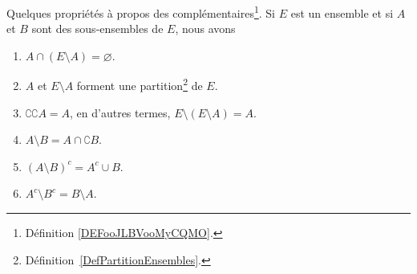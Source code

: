\begin{lemma}       \label{LemPropsComplement}
	Quelques propriétés à propos des complémentaires\footnote{Définition \ref{DEFooJLBVooMyCQMO}.}. Si \( E\) est un ensemble et si \( A\) et \( B\) sont des sous-ensembles de \( E\), nous avons
	\begin{enumerate}
		\item       \label{ITEMooComplementDisjoint}
		      \(A \cap ( E \setminus A) = \varnothing \).
		\item       \label{ITEMooComplementPartition}
		      \( A \) et \( E \setminus A \) forment une partition\footnote{Définition~\ref{DefPartitionEnsembles}.} de \( E \).
		\item       \label{ITEMooWIYBooKMLVnZ}
		      \( \complement \complement A =A\), en d'autres termes, \( E\setminus(E\setminus A)=A\).
		\item       \label{ItemLemPropComplementiii}
		      \( A\setminus B=A\cap\complement B\).
		\item       \label{ITEMooNHDUooWtURqQ}
		      \( (A\setminus B)^c=A^c\cup B\).
		\item       \label{ITEMooTBWKooTChOmC}
		      \( A^c\setminus B^c=B\setminus A\).
	\end{enumerate}
\end{lemma}

